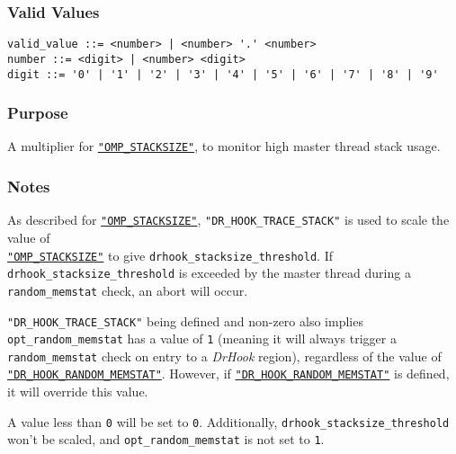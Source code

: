 \subsubsection{Valid Values}
\vspace{-2ex}
\verb+valid_value ::= <number> | <number> '.' <number> + \\
\verb+number ::= <digit> | <number> <digit>+ \\
\verb+digit ::= '0' | '1' | '2' | '3' | '4' | '5' | '6' | '7' | '8' | '9'+

\vspace{-2ex}
\subsubsection{Purpose}
\vspace{-2ex}
A multiplier for \hyperref[section:flags:OMP_STACKSIZE]{\texttt{"OMP\_STACKSIZE"}}, to monitor high master thread stack usage.

\vspace{-2ex}
\subsubsection{Notes}
\vspace{-2ex}
As described for \hyperref[section:flags:OMP_STACKSIZE]{\texttt{"OMP\_STACKSIZE"}}, \texttt{"DR\_HOOK\_TRACE\_STACK"} is used to scale the value of \\\hyperref[section:flags:OMP_STACKSIZE]{\texttt{"OMP\_STACKSIZE"}} to give \verb|drhook_stacksize_threshold|. If \\\verb|drhook_stacksize_threshold| is exceeded by the master thread during a \verb|random_memstat| check, an abort will occur.

\texttt{"DR\_HOOK\_TRACE\_STACK"} being defined and non-zero also implies \verb|opt_random_memstat| has a value of \verb|1| (meaning it will always trigger a \verb|random_memstat| check on entry to a \textit{DrHook} region), regardless of the value of \hyperref[section:flags:DR_HOOK_RANDOM_MEMSTAT]{\texttt{"DR\_HOOK\_RANDOM\_MEMSTAT"}}. However, if \hyperref[section:flags:DR_HOOK_RANDOM_MEMSTAT]{\texttt{"DR\_HOOK\_RANDOM\_MEMSTAT"}} is defined, it will override this value.

A value less than \verb|0| will be set to \verb|0|. Additionally, \texttt{drhook\_stacksize\_threshold} won't be scaled, and \texttt{opt\_random\_memstat} is not set to \verb|1|.

